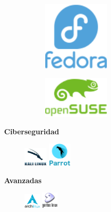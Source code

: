 \documentclass[aspectratio=43]{beamer}
\begin{document}
\begin{frame}{\secname}{\subsecname}
\begin{figure}[b]
\begin{subfigure}{.3\textwidth}
            \end{subfigure}
            \begin{subfigure}{.3\textwidth}
                \centering
                \includegraphics[width=0.35\textwidth]{img/fedora.png}
            \end{subfigure}
            \begin{subfigure}{.3\textwidth}
                \centering
                \includegraphics[width=0.35\textwidth]{img/opensuse.png}
            \end{subfigure}
        \end{figure}
        \begin{multicols}{3}
            \pause
            \centering \textbf{Ciberseguridad}
            \begin{figure}
                \includegraphics[width=0.1\textwidth]{img/kali.png}
                \includegraphics[width=0.1\textwidth]{img/parrot.png}
            \end{figure}
            \newpage
            \pause
            \centering \textbf{Avanzadas}
            \begin{figure}
                \includegraphics[width=0.07\textwidth]{img/arch.png}
                \includegraphics[width=0.07\textwidth]{img/gentoo.png}

\end{figure}
\end{multicols}
\end{frame}
\end{document}
